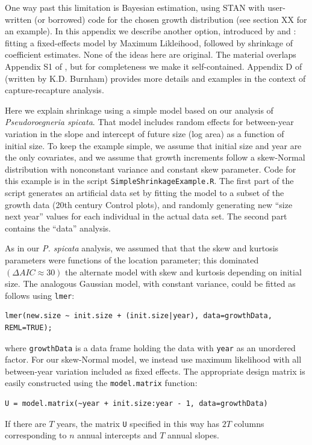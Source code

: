 \documentclass[12pt]{article}
\begin{document}
One way past this limitation is Bayesian estimation, using STAN with user-written (or borrowed) 
code for the chosen growth distribution (see section XX for an example). 
In this appendix we describe another option, introduced by \citet{link-nichols-1994} and \citet{gould-nichols-1998}: 
fitting a fixed-effects model by Maximum Likleihood, followed by shrinkage of coefficient estimates. 
None of the ideas here are original. The material overlaps Appendix S1 of \citet{metcalf-etal-2015}, 
but for completeness we make it self-contained. Appendix D of \citet{cooch-white-2020} (written by K.D. Burnham)
provides more details and examples in the context of capture-recapture analysis. 

Here we explain shrinkage using a simple model based on our analysis of \emph{Pseudoroegneria spicata}. 
That model includes random effects for between-year variation in the slope and intercept of future size 
(log area) as a function of initial size. To keep the example simple, we assume that initial size 
and year are the only covariates, and we assume that growth increments 
follow a skew-Normal distribution with nonconstant variance and constant skew parameter. 
Code for this example is in the script \texttt{SimpleShrinkageExample.R}. The first part of the script generates
an artificial data set by fitting the model to a subset of the growth data (20th century Control plots), and
randomly generating new ``size next year'' values for each individual in the actual data set. 
The second part contains the ``data'' analysis. 

As in our \emph{P. spicata} analysis, we assumed that that the skew and kurtosis parameters were functions
of the location parameter; this dominated $(\Delta AIC \approx 30)$ the alternate 
model with skew and kurtosis depending on initial size.   
The analogous Gaussian model, with constant variance, could be fitted as follows using \texttt{lmer}:
\begin{lstlisting}
lmer(new.size ~ init.size + (init.size|year), data=growthData, REML=TRUE); 
\end{lstlisting}
where \texttt{growthData} is a data frame holding the data with \texttt{year} as an unordered factor. For our skew-Normal
model, we instead use maximum likelihood with all between-year variation included as fixed effects. The appropriate design
matrix is easily constructed using the \texttt{model.matrix} function: 
\begin{lstlisting}
U = model.matrix(~year + init.size:year - 1, data=growthData)
\end{lstlisting}
If there are $T$ years, the matrix \texttt{U} specified in this way has $2T$ columns corresponding to $n$ annual 
intercepts and $T$ annual slopes. 
\end{document}
